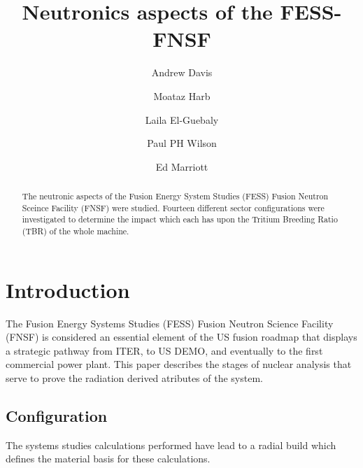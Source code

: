\documentclass[12pt, letterpaper]{elsarticle}
\title{Neutronics aspects of the FESS-FNSF}
\author[wisc]{Andrew Davis\corref{cor1}}
\author[wisc]{Moataz Harb}
\author[wisc]{Laila El-Guebaly}
\author[wisc]{Paul PH Wilson}
\author[wisc]{Ed Marriott}
\begin{document}
 
\begin{abstract}
The neutronic aspects of the Fusion Energy System Studies (FESS) Fusion Neutron Sceince 
Facility (FNSF) were studied. Fourteen different sector configurations were investigated to 
determine the impact which each has upon the Tritium Breeding Ratio (TBR) of the whole machine.

\end{abstract}

\begin{titlepage}
\maketitle
\end{titlepage}


\section{Introduction}
The Fusion Energy Systems Studies (FESS) Fusion Neutron Science Facility (FNSF) 
is considered an essential element of the US fusion roadmap that displays a strategic 
pathway from ITER, to US DEMO, and eventually to the first commercial power plant. This paper
describes the stages of nuclear analysis that serve to prove the radiation derived atributes
of the system.

\subsection{Configuration}
The systems studies calculations performed have lead to a radial build which defines the material
basis for these calculations.
\end{document}
